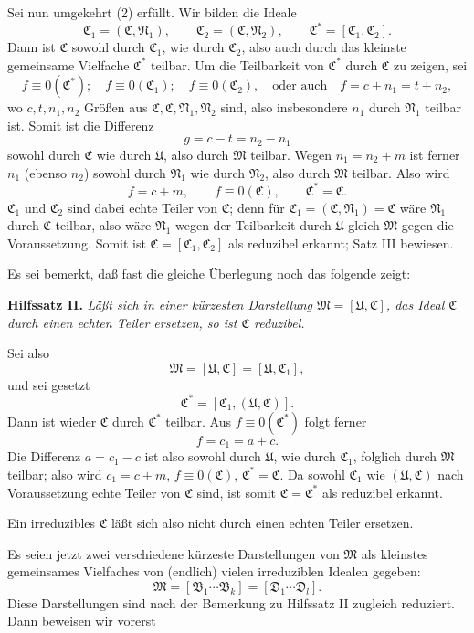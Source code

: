 \documentclass[11pt]{article}
\newcommand{\ideal}[1]{\mathfrak{#1}}
\begin{document}
Sei nun umgekehrt (2) erfüllt. Wir bilden die Ideale
\[
 \ideal C_1=(\ideal C,\ideal N_1),\qquad
 \ideal C_2=(\ideal C,\ideal N_2),\qquad
 \ideal C^*=[\ideal C_1,\ideal C_2].
\]
Dann ist $\ideal C$ sowohl durch $\ideal C_1$, wie durch $\ideal C_2$, also auch durch das kleinste gemeinsame Vielfache $\ideal C^*$ teilbar. Um die Teilbarkeit von $\ideal C^*$ durch $\ideal C$ zu zeigen, sei
\[
 f\equiv0(\ideal C^*);\quad f\equiv0(\ideal C_1);\quad f\equiv0(\ideal C_2),
 \quad\text{oder auch}\quad f=c+n_1=t+n_2,
\]
wo $c,t,n_1,n_2$ Größen aus $\ideal C,\ideal C,\ideal N_1,\ideal N_2$ sind, also insbesondere $n_1$ durch $\ideal N_1$ teilbar ist. Somit ist die Differenz
\[
 g=c-t=n_2-n_1
\]
sowohl durch $\ideal C$ wie durch $\ideal U$, also durch $\ideal M$ teilbar. Wegen $n_1=n_2+m$ ist ferner $n_1$ (ebenso $n_2$) sowohl durch $\ideal N_1$ wie durch $\ideal N_2$, also durch $\ideal M$ teilbar. Also wird
\[
 f=c+m,\qquad f\equiv0(\ideal C),\qquad \ideal C^*=\ideal C.
\]
$\ideal C_1$ und $\ideal C_2$ sind dabei echte Teiler von $\ideal C$; denn für $\ideal C_1=(\ideal C,\ideal N_1)=\ideal C$ wäre $\ideal N_1$ durch $\ideal C$ teilbar, also wäre $\ideal N_1$ wegen der Teilbarkeit durch $\ideal U$ gleich $\ideal M$ gegen die Voraussetzung. Somit ist $\ideal C=[\ideal C_1,\ideal C_2]$ als reduzibel erkannt; Satz III bewiesen.

Es sei bemerkt, daß fast die gleiche Überlegung noch das folgende zeigt:

\textbf{Hilfssatz II.} \emph{Läßt sich in einer kürzesten Darstellung $\ideal M=[\ideal U,\ideal C]$, das Ideal $\ideal C$ durch einen echten Teiler ersetzen, so ist $\ideal C$ reduzibel.}

Sei also
\[
 \ideal M=[\ideal U,\ideal C]=[\ideal U,\ideal C_1],
\]
und sei gesetzt
\[
 \ideal C^*=[\ideal C_1,(\ideal U,\ideal C)].
\]
Dann ist wieder $\ideal C$ durch $\ideal C^*$ teilbar. Aus $f\equiv0(\ideal C^*)$ folgt ferner
\[
 f=c_1=a+c.
\]
Die Differenz $a=c_1-c$ ist also sowohl durch $\ideal U$, wie durch $\ideal C_1$, folglich durch $\ideal M$ teilbar; also wird $c_1=c+m$, $f\equiv0(\ideal C)$, $\ideal C^*=\ideal C$. Da sowohl $\ideal C_1$ wie $(\ideal U,\ideal C)$ nach Voraussetzung echte Teiler von $\ideal C$ sind, ist somit $\ideal C=\ideal C^*$ als reduzibel erkannt.

Ein irreduzibles $\ideal C$ läßt sich also nicht durch einen echten Teiler ersetzen.

Es seien jetzt zwei verschiedene kürzeste Darstellungen von $\ideal M$ als kleinstes gemeinsames Vielfaches von (endlich) vielen irreduziblen Idealen gegeben:
\[
 \ideal M=[\ideal B_1\cdots\ideal B_k]=[\ideal D_1\cdots\ideal D_l].
\]
Diese Darstellungen sind nach der Bemerkung zu Hilfssatz II zugleich reduziert. Dann beweisen wir vorerst
\end{document}
